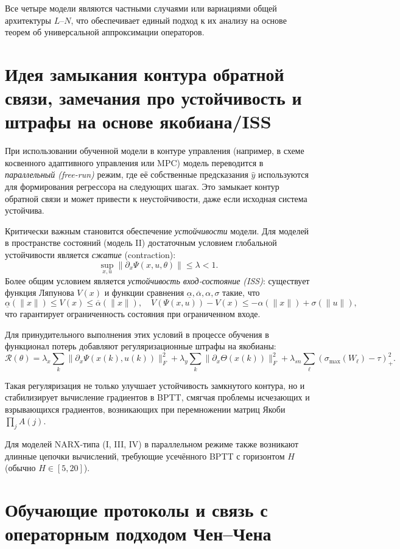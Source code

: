 \documentclass[12pt]{article}
\begin{document}
Все четыре модели являются частными случаями или вариациями общей архитектуры \(L\)--\(N\), что обеспечивает единый подход к их анализу на основе теорем об универсальной аппроксимации операторов.

\section{Идея замыкания контура обратной связи, замечания про устойчивость и штрафы на основе якобиана/ISS}

При использовании обученной модели в контуре управления (например, в схеме косвенного адаптивного управления или MPC) модель переводится в \emph{параллельный (free-run)} режим, где её собственные предсказания \(\hat{y}\) используются для формирования регрессора на следующих шагах. Это замыкает контур обратной связи и может привести к неустойчивости, даже если исходная система устойчива.

Критически важным становится обеспечение \emph{устойчивости} модели. Для моделей в пространстве состояний (модель II) достаточным условием глобальной устойчивости является \emph{сжатие} (contraction):
\[
  \sup_{x, u} \| \partial_x \Psi(x, u, \theta) \| \leq \lambda < 1.
\]
Более общим условием является \emph{устойчивость вход-состояние (ISS)}: существует функция Ляпунова \(V(x)\) и функции сравнения \(\underline{\alpha}, \overline{\alpha}, \alpha, \sigma\) такие, что
\[
  \underline{\alpha}(\|x\|) \leq V(x) \leq \overline{\alpha}(\|x\|), \quad V(\Psi(x, u)) - V(x) \leq -\alpha(\|x\|) + \sigma(\|u\|),
\]
что гарантирует ограниченность состояния при ограниченном входе.

Для принудительного выполнения этих условий в процессе обучения в функционал потерь добавляют регуляризационные штрафы на якобианы:
\[
  \mathcal{R}(\theta) = \lambda_x \sum_k \|\partial_x \Psi(x(k), u(k))\|_F^2 + \lambda_y \sum_k \|\partial_x \Theta(x(k))\|_F^2 + \lambda_{sn} \sum_\ell (\sigma_{\max}(W_\ell) - \tau)_+^2.
\]

Такая регуляризация не только улучшает устойчивость замкнутого контура, но и стабилизирует вычисление градиентов в BPTT, смягчая проблемы исчезающих и взрывающихся градиентов, возникающих при перемножении матриц Якоби \(\prod_j A(j)\).

Для моделей NARX-типа (I, III, IV) в параллельном режиме также возникают длинные цепочки вычислений, требующие усечённого BPTT с горизонтом \(H\) (обычно \(H \in [5, 20]\)).

\section{Обучающие протоколы и связь с операторным подходом Чен--Чена}
\end{document}
